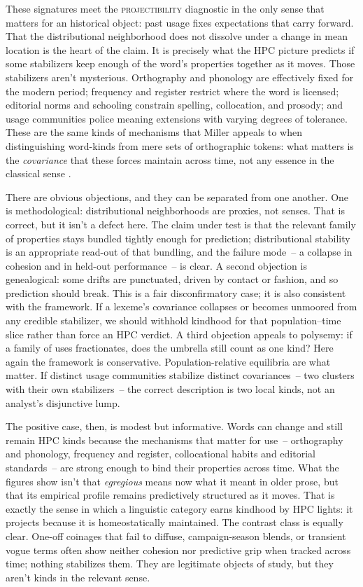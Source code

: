 \documentclass[12pt]{article}
\begin{document}
These signatures meet the \textsc{projectibility} diagnostic in the only sense that matters for an historical object: past usage fixes expectations that carry forward. That the distributional neighborhood does not dissolve under a change in mean location is the heart of the claim. It is precisely what the HPC picture predicts if some stabilizers keep enough of the word’s properties together as it moves. Those stabilizers aren't mysterious. Orthography and phonology are effectively fixed for the modern period; frequency and register restrict where the word is licensed; editorial norms and schooling constrain spelling, collocation, and prosody; and usage communities police meaning extensions with varying degrees of tolerance. These are the same kinds of mechanisms that Miller appeals to when distinguishing word-kinds from mere sets of orthographic tokens: what matters is the \emph{covariance} that these forces maintain across time, not any essence in the classical sense \citep{Miller2021WordsSpeciesKinds}.

There are obvious objections, and they can be separated from one another. One is methodological: distributional neighborhoods are proxies, not senses. That is correct, but it isn't a defect here. The claim under test is that the relevant family of properties stays bundled tightly enough for prediction; distributional stability is an appropriate read-out of that bundling, and the failure mode~-- a collapse in cohesion and in held-out performance~-- is clear. A second objection is genealogical: some drifts are punctuated, driven by contact or fashion, and so prediction should break. This is a fair disconfirmatory case; it is also consistent with the framework. If a lexeme’s covariance collapses or becomes unmoored from any credible stabilizer, we should withhold kindhood for that population–time slice rather than force an HPC verdict. A third objection appeals to polysemy: if a family of uses fractionates, does the umbrella still count as one kind? Here again the framework is conservative. Population-relative equilibria are what matter. If distinct usage communities stabilize distinct covariances~-- two clusters with their own stabilizers~-- the correct description is two local kinds, not an analyst’s disjunctive lump.

The positive case, then, is modest but informative. Words can change and still remain \textsc{HPC} kinds because the mechanisms that matter for use~-- orthography and phonology, frequency and register, collocational habits and editorial standards~-- are strong enough to bind their properties across time. What the figures show isn't that \emph{egregious} means now what it meant in older prose, but that its empirical profile remains predictively structured as it moves. That is exactly the sense in which a linguistic category earns kindhood by HPC lights: it projects because it is homeostatically maintained. The contrast class is equally clear. One-off coinages that fail to diffuse, campaign-season blends, or transient vogue terms often show neither cohesion nor predictive grip when tracked across time; nothing stabilizes them. They are legitimate objects of study, but they aren't kinds in the relevant sense.
\end{document}
